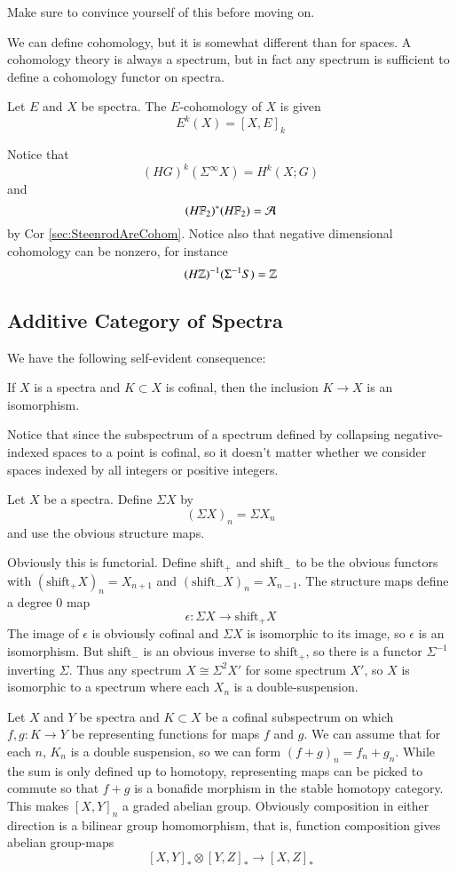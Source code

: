 Make sure to convince yourself of this before moving on.  

We can define cohomology, but it is somewhat different than for spaces.  A cohomology theory is always a spectrum, but in fact any spectrum is sufficient to define a cohomology functor on spectra.  
\begin{Def}
  Let $E$ and $X$ be spectra.  
  The $E$-cohomology of $X$ is given
  \[E^k(X)=[X,E]_k\]
\end{Def}
Notice that 
\[(HG)^k(\Sigma^\infty X)=H^k(X;G)\]
and
\[(H\mathbb{F}_2)^*(H\mathbb{F}_2)=\mathcal{A}\]
by Cor  \ref{sec:SteenrodAreCohom}.  
Notice also that negative dimensional cohomology can be nonzero, for instance
\[(H\mathbb{Z})^{-1}(\Sigma^{-1}S) = \mathbb{Z}\]

\subsection{Additive Category of Spectra}

We have the following self-evident consequence:
\begin{Lemma}
  If $X$ is a spectra and $K\subset X$ is cofinal, then the inclusion $K\to X$ is an isomorphism.
\end{Lemma}

Notice that since the subspectrum of a spectrum defined by collapsing negative-indexed spaces to a point is cofinal, so it doesn't matter whether we consider spaces indexed by all integers or positive integers.  

\begin{Def}
  Let $X$ be a spectra.  Define $\Sigma X$ by
  \[(\Sigma X)_n=\Sigma X_n\]
  and use the obvious structure maps.
\end{Def}
Obviously this is functorial.  
Define $\mbox{shift}_+$ and $\mbox{shift}_-$ to be the obvious functors with $(\mbox{shift}_+X)_n = X_{n+1}$ and $(\mbox{shift}_-X)_n = X_{n-1}$.  
The structure maps define a degree 0 map 
\[\epsilon:\Sigma X\to \mbox{shift}_+X\]
The image of $\epsilon$ is obviously cofinal and $\Sigma X$ is isomorphic to its image, so $\epsilon$ is an isomorphism.  
But $\mbox{shift}_-$ is an obvious inverse to $\mbox{shift}_+$, so there is a functor $\Sigma^{-1}$ inverting $\Sigma$.  
Thus any spectrum $X\cong\Sigma^2 X'$ for some spectrum $X'$, so $X$ is isomorphic to a spectrum where each $X_n$ is a double-suspension.  

Let $X$ and $Y$ be spectra and $K\subset X$ be a cofinal subspectrum on which $f,g:K\to Y$ be representing functions for maps $f$ and $g$.  
We can assume that for each $n$, $K_n$ is a double suspension, so we can form $(f+g)_n=f_n+g_n$.  
While the sum is only defined up to homotopy, representing maps can be picked to commute so that $f+g$ is a bonafide morphism in the stable homotopy category.  
This makes $[X,Y]_n$ a graded abelian group.  
Obviously composition in either direction is a bilinear group homomorphism, that is, function composition gives abelian group-maps
\[[X,Y]_*\otimes [Y,Z]_*\to [X,Z]_*\]

